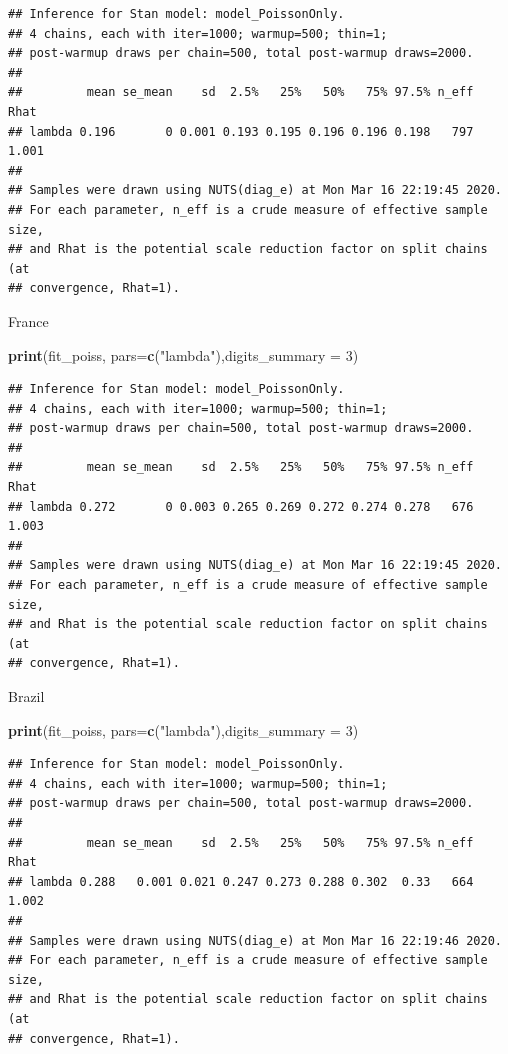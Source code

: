 \documentclass[]{article}
\newenvironment{Shaded}{\begin{snugshade}}{\end{snugshade}}
\newcommand{\DataTypeTok}[1]{\textcolor[rgb]{0.13,0.29,0.53}{#1}}
\newcommand{\DecValTok}[1]{\textcolor[rgb]{0.00,0.00,0.81}{#1}}
\newcommand{\KeywordTok}[1]{\textcolor[rgb]{0.13,0.29,0.53}{\textbf{#1}}}
\newcommand{\NormalTok}[1]{#1}
\newcommand{\StringTok}[1]{\textcolor[rgb]{0.31,0.60,0.02}{#1}}
\begin{document}
\begin{verbatim}
## Inference for Stan model: model_PoissonOnly.
## 4 chains, each with iter=1000; warmup=500; thin=1; 
## post-warmup draws per chain=500, total post-warmup draws=2000.
## 
##         mean se_mean    sd  2.5%   25%   50%   75% 97.5% n_eff  Rhat
## lambda 0.196       0 0.001 0.193 0.195 0.196 0.196 0.198   797 1.001
## 
## Samples were drawn using NUTS(diag_e) at Mon Mar 16 22:19:45 2020.
## For each parameter, n_eff is a crude measure of effective sample size,
## and Rhat is the potential scale reduction factor on split chains (at 
## convergence, Rhat=1).
\end{verbatim}

France

\begin{Shaded}
\begin{Highlighting}[]
\KeywordTok{print}\NormalTok{(fit_poiss, }\DataTypeTok{pars=}\KeywordTok{c}\NormalTok{(}\StringTok{"lambda"}\NormalTok{),}\DataTypeTok{digits_summary =} \DecValTok{3}\NormalTok{)}
\end{Highlighting}
\end{Shaded}

\begin{verbatim}
## Inference for Stan model: model_PoissonOnly.
## 4 chains, each with iter=1000; warmup=500; thin=1; 
## post-warmup draws per chain=500, total post-warmup draws=2000.
## 
##         mean se_mean    sd  2.5%   25%   50%   75% 97.5% n_eff  Rhat
## lambda 0.272       0 0.003 0.265 0.269 0.272 0.274 0.278   676 1.003
## 
## Samples were drawn using NUTS(diag_e) at Mon Mar 16 22:19:45 2020.
## For each parameter, n_eff is a crude measure of effective sample size,
## and Rhat is the potential scale reduction factor on split chains (at 
## convergence, Rhat=1).
\end{verbatim}

Brazil

\begin{Shaded}
\begin{Highlighting}[]
\KeywordTok{print}\NormalTok{(fit_poiss, }\DataTypeTok{pars=}\KeywordTok{c}\NormalTok{(}\StringTok{"lambda"}\NormalTok{),}\DataTypeTok{digits_summary =} \DecValTok{3}\NormalTok{)}
\end{Highlighting}
\end{Shaded}

\begin{verbatim}
## Inference for Stan model: model_PoissonOnly.
## 4 chains, each with iter=1000; warmup=500; thin=1; 
## post-warmup draws per chain=500, total post-warmup draws=2000.
## 
##         mean se_mean    sd  2.5%   25%   50%   75% 97.5% n_eff  Rhat
## lambda 0.288   0.001 0.021 0.247 0.273 0.288 0.302  0.33   664 1.002
## 
## Samples were drawn using NUTS(diag_e) at Mon Mar 16 22:19:46 2020.
## For each parameter, n_eff is a crude measure of effective sample size,
## and Rhat is the potential scale reduction factor on split chains (at 
## convergence, Rhat=1).
\end{verbatim}
\end{document}

